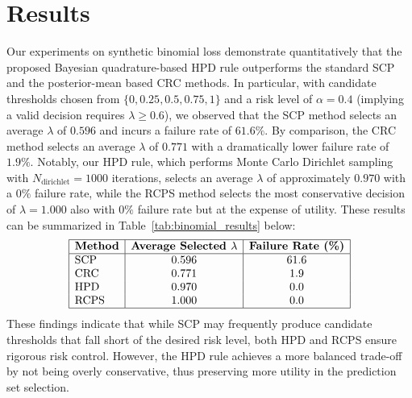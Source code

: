 \documentclass{article}
\begin{document}
\section{Results}
Our experiments on synthetic binomial loss demonstrate quantitatively that the proposed Bayesian quadrature-based HPD rule outperforms the standard SCP and the posterior-mean based CRC methods. In particular, with candidate thresholds chosen from \(\{0, 0.25, 0.5, 0.75, 1\}\) and a risk level of \(\alpha = 0.4\) (implying a valid decision requires \(\lambda \geq 0.6\)), we observed that the SCP method selects an average \(\lambda\) of \(0.596\) and incurs a failure rate of \(61.6\%\). By comparison, the CRC method selects an average \(\lambda\) of \(0.771\) with a dramatically lower failure rate of \(1.9\%\). Notably, our HPD rule, which performs Monte Carlo Dirichlet sampling with \(N_{\text{dirichlet}} = 1000\) iterations, selects an average \(\lambda\) of approximately \(0.970\) with a \(0\%\) failure rate, while the RCPS method selects the most conservative decision of \(\lambda = 1.000\) also with \(0\%\) failure rate but at the expense of utility. These results can be summarized in Table~\ref{tab:binomial_results} below:
\[
\begin{array}{|l|c|c|}
\hline
\textbf{Method} & \textbf{Average Selected } \lambda & \textbf{Failure Rate (\%)} \\
\hline
\text{SCP} & 0.596 & 61.6 \\
\text{CRC} & 0.771 & 1.9 \\
\text{HPD} & 0.970 & 0.0 \\
\text{RCPS} & 1.000 & 0.0 \\
\hline
\end{array}
\]
These findings indicate that while SCP may frequently produce candidate thresholds that fall short of the desired risk level, both HPD and RCPS ensure rigorous risk control. However, the HPD rule achieves a more balanced trade-off by not being overly conservative, thus preserving more utility in the prediction set selection.
\end{document}
